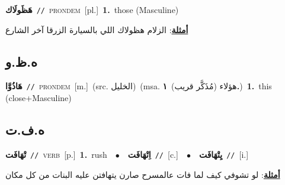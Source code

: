 \documentclass[10pt,a4paper,twoside]{article} %
\begin{document}
\begin{multicols}{2}
{\setlength\topsep{0pt}\textbf{\foreignlanguage{arabic}{هَظَولَاك}}\ {\color{gray}\texttt{//}\color{black}}\ \textsc{pron\textunderscore dem}\ [pl.]\ \textbf{1.}~those (Masculine)\  \begin{flushright}\color{gray}\foreignlanguage{arabic}{\textbf{\underline{\foreignlanguage{arabic}{أمثلة}}}: الزلام هظولاك اللي بالسيارة الزرقا آخر الشارع}\end{flushright}\color{black}} \vspace{2mm}

\vspace{-3mm}
\subsection*{\color{blue}\foreignlanguage{arabic}{ه.ظ.و}\color{blue}{ (ntws)}} 

{\setlength\topsep{0pt}\textbf{\foreignlanguage{arabic}{هَاذُوَّا}}\ {\color{gray}\texttt{//}\color{black}}\ \textsc{pron\textunderscore dem}\ [m.]\ (src. \color{gray}\foreignlanguage{arabic}{الخليل}\color{black})\ \color{gray}(msa. \foreignlanguage{arabic}{هؤلاء (مُذَكَّر قريب)}~\foreignlanguage{arabic}{\textbf{١.}})\color{black}\ \textbf{1.}~this (close+Masculine)\ } \vspace{2mm}

\vspace{-3mm}
\subsection*{\color{blue}\foreignlanguage{arabic}{ه.ف.ت}\color{blue}{}} 

{\setlength\topsep{0pt}\textbf{\foreignlanguage{arabic}{تْهَافَت}}\ {\color{gray}\texttt{//}\color{black}}\ \textsc{verb}\ [p.]\ \textbf{1.}~rush\ \ $\bullet$\ \ \setlength\topsep{0pt}\textbf{\foreignlanguage{arabic}{اِتْهَافَت}}\ {\color{gray}\texttt{//}\color{black}}\ [c.]\ \ $\bullet$\ \ \setlength\topsep{0pt}\textbf{\foreignlanguage{arabic}{يِتْهَافَت}}\ {\color{gray}\texttt{//}\color{black}}\ [i.]\  \begin{flushright}\color{gray}\foreignlanguage{arabic}{\textbf{\underline{\foreignlanguage{arabic}{أمثلة}}}: لو تشوفي كيف لما فات عالمسرح صارن يتهافتن عليه البنات من كل مكان}\end{flushright}\color{black}} \vspace{2mm}


\end{multicols}
\end{document}
